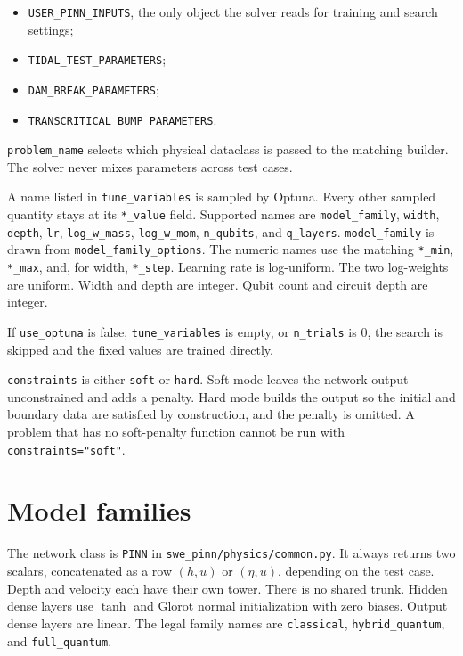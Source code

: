 \documentclass[11pt]{article}
\begin{document}
\begin{itemize}[leftmargin=1.4em]
\item \texttt{USER\_PINN\_INPUTS}, the only object the solver reads for training and search settings;
\item \texttt{TIDAL\_TEST\_PARAMETERS};
\item \texttt{DAM\_BREAK\_PARAMETERS};
\item \texttt{TRANSCRITICAL\_BUMP\_PARAMETERS}.
\end{itemize}

\texttt{problem\_name} selects which physical dataclass is passed to the matching builder.
The solver never mixes parameters across test cases.

A name listed in \texttt{tune\_variables} is sampled by Optuna.
Every other sampled quantity stays at its \texttt{*\_value} field.
Supported names are \texttt{model\_family}, \texttt{width}, \texttt{depth}, \texttt{lr}, \texttt{log\_w\_mass}, \texttt{log\_w\_mom}, \texttt{n\_qubits}, and \texttt{q\_layers}.
\texttt{model\_family} is drawn from \texttt{model\_family\_options}.
The numeric names use the matching \texttt{*\_min}, \texttt{*\_max}, and, for width, \texttt{*\_step}.
Learning rate is log-uniform.
The two log-weights are uniform.
Width and depth are integer.
Qubit count and circuit depth are integer.

If \texttt{use\_optuna} is false, \texttt{tune\_variables} is empty, or \texttt{n\_trials} is 0, the search is skipped and the fixed values are trained directly.

\texttt{constraints} is either \texttt{soft} or \texttt{hard}.
Soft mode leaves the network output unconstrained and adds a penalty.
Hard mode builds the output so the initial and boundary data are satisfied by construction, and the penalty is omitted.
A problem that has no soft-penalty function cannot be run with \texttt{constraints="soft"}.

\section{Model families}
\label{sec:families}

The network class is \texttt{PINN} in \texttt{swe\_pinn/physics/common.py}.
It always returns two scalars, concatenated as a row \((h,u)\) or \((\eta,u)\), depending on the test case.
Depth and velocity each have their own tower.
There is no shared trunk.
Hidden dense layers use \(\tanh\) and Glorot normal initialization with zero biases.
Output dense layers are linear.
The legal family names are \texttt{classical}, \texttt{hybrid\_quantum}, and \texttt{full\_quantum}.
\end{document}
